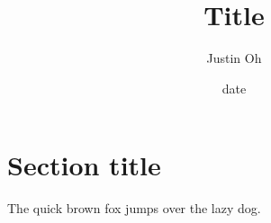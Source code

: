 \documentclass[12pt]{article}
\begin{document}
\begin{singlespace}
    \title{Title}
    \date{date}
    \author{Justin Oh}
    \maketitle
\end{singlespace}


    \section*{Section title}
    The quick brown fox jumps over the lazy dog.
\end{document}
